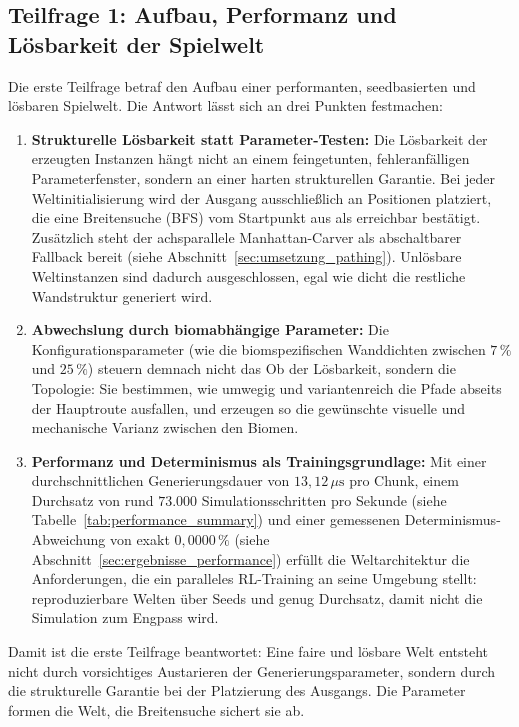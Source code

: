 \documentclass[
  a4paper,
  11pt,
  twoside,
  BCOR=8mm,           %
  headings=big,
  numbers=noenddot,
  listof=totoc,       %
  captions=tableheading,
]{scrreprt}
\begin{document}
\subsection*{Teilfrage 1: Aufbau, Performanz und Lösbarkeit der Spielwelt}
Die erste Teilfrage betraf den Aufbau einer performanten, seedbasierten und lösbaren Spielwelt. Die Antwort lässt sich an drei Punkten festmachen:

\begin{enumerate}
    \item \textbf{Strukturelle Lösbarkeit statt Parameter-Testen:}
    Die Lösbarkeit der erzeugten Instanzen hängt nicht an einem feingetunten, fehleranfälligen Parameterfenster, sondern an einer harten strukturellen Garantie. Bei jeder Weltinitialisierung wird der Ausgang ausschließlich an Positionen platziert, die eine Breitensuche (BFS) vom Startpunkt aus als erreichbar bestätigt. Zusätzlich steht der achsparallele Manhattan-Carver als abschaltbarer Fallback bereit (siehe Abschnitt~\ref{sec:umsetzung_pathing}). Unlösbare Weltinstanzen sind dadurch ausgeschlossen, egal wie dicht die restliche Wandstruktur generiert wird.

    \item \textbf{Abwechslung durch biomabhängige Parameter:}
    Die Konfigurationsparameter (wie die biomspezifischen Wanddichten zwischen $7\,\%$ und $25\,\%$) steuern demnach nicht das Ob der Lösbarkeit, sondern die Topologie: Sie bestimmen, wie umwegig und variantenreich die Pfade abseits der Hauptroute ausfallen, und erzeugen so die gewünschte visuelle und mechanische Varianz zwischen den Biomen.

    \item \textbf{Performanz und Determinismus als Trainingsgrundlage:}
    Mit einer durchschnittlichen Generierungsdauer von $13{,}12\,\mu\text{s}$ pro Chunk, einem Durchsatz von rund $73.000$ Simulationsschritten pro Sekunde (siehe Tabelle~\ref{tab:performance_summary}) und einer gemessenen Determinismus-Abweichung von exakt $0{,}0000\,\%$ (siehe Abschnitt~\ref{sec:ergebnisse_performance}) erfüllt die Weltarchitektur die Anforderungen, die ein paralleles RL-Training an seine Umgebung stellt: reproduzierbare Welten über Seeds und genug Durchsatz, damit nicht die Simulation zum Engpass wird.
\end{enumerate}

Damit ist die erste Teilfrage beantwortet: Eine faire und lösbare Welt entsteht nicht durch vorsichtiges Austarieren der Generierungsparameter, sondern durch die strukturelle Garantie bei der Platzierung des Ausgangs. Die Parameter formen die Welt, die Breitensuche sichert sie ab.
\end{document}
